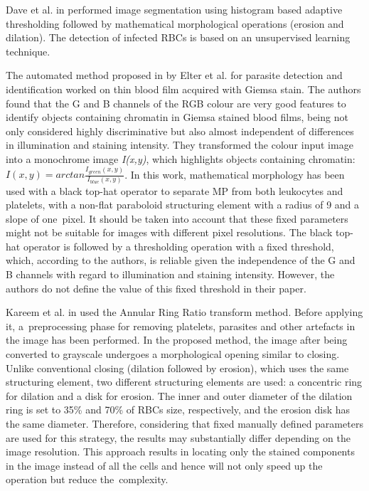 \documentclass[final,a4paper,12pt,english]{UnicaPhdThesis3}
\begin{document}
Dave et al. in \cite{Dave2017} performed image segmentation using histogram based adaptive thresholding followed by mathematical morphological operations (erosion and dilation). The detection of infected RBCs is based on an unsupervised learning technique.

The automated method proposed in \cite{Elter2011} by Elter et al. for parasite detection and identification worked on thin blood film acquired with Giemsa stain. The authors found that the G and B channels of the RGB colour are very good features to identify objects containing chromatin in Giemsa stained blood films, being not only considered highly discriminative but also almost independent of differences in illumination and staining intensity. They transformed the colour input image into a monochrome image \textit{I(x,y)}, which highlights objects containing chromatin: $ I(x,y) = arctan \frac{I_{green}(x,y)}{I_{blue}(x,y)} $. In this work, mathematical morphology has been used with a black top-hat operator to separate MP from both leukocytes and platelets, with a non-flat paraboloid structuring element with a radius of 9 and a slope of one~pixel. It should be taken into account that these fixed parameters might not be suitable for images with different pixel resolutions. The black top-hat operator is followed by a thresholding operation with a fixed threshold, which, according to the authors, is reliable given the independence of the G and B channels with regard to illumination and staining intensity. However, the authors do not define the value of this fixed threshold in their paper.

Kareem et al. in \cite{Kareem2011} used the Annular Ring Ratio transform method. Before applying it, a~preprocessing phase for removing platelets, parasites and other artefacts in the image has been performed. In the proposed method, the image after being converted to grayscale undergoes a morphological opening similar to closing. Unlike conventional closing (dilation followed by erosion), which uses the same structuring element, two different structuring elements are used: a concentric ring for dilation and a disk for erosion. The inner and outer diameter of the dilation ring is set to 35\% and 70\% of RBCs size, respectively, and the erosion disk has the same diameter. Therefore, considering that fixed manually defined parameters are used for this strategy, the results may substantially differ depending on the image resolution. This approach results in locating only the stained components in the image instead of all the cells and hence will not only speed up the operation but reduce the~complexity.
\end{document}
